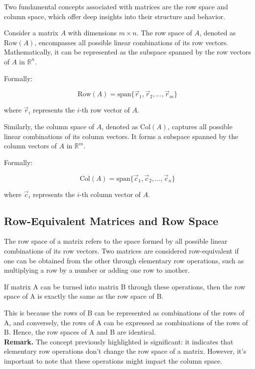Two fundamental concepts associated with matrices are the row space and column space, which offer deep insights into their structure and behavior.

Consider a matrix $A$ with dimensions $m \times n$. The row space of $A$, denoted as $\text{Row}(A)$, encompasses all possible linear combinations of its row vectors. Mathematically, it can be represented as the subspace spanned by the row vectors of $A$ in $\mathbb{R}^n$. 

Formally:

\[
\text{Row}(A) = \text{span}\{\vec{r}_1, \vec{r}_2, \ldots, \vec{r}_m\}
\]

where $\vec{r}_i$ represents the $i$-th row vector of $A$.

Similarly, the column space of $A$, denoted as $\text{Col}(A)$, captures all possible linear combinations of its column vectors. It forms a subspace spanned by the column vectors of $A$ in $\mathbb{R}^m$. 

Formally:

\[
\text{Col}(A) = \text{span}\{\vec{c}_1, \vec{c}_2, \ldots, \vec{c}_n\}
\]

where $\vec{c}_i$ represents the $i$-th column vector of $A$.

\subsection{Row-Equivalent Matrices and Row Space}

The row space of a matrix refers to the space formed by all possible linear combinations of its row vectors. Two matrices are considered row-equivalent if one can be obtained from the other through elementary row operations, such as multiplying a row by a number or adding one row to another. 

If matrix A can be turned into matrix B through these operations, then the row space of A is exactly the same as the row space of B.

This is because the rows of B can be represented as combinations of the rows of A, and conversely, the rows of A can be expressed as combinations of the rows of B. Hence, the row spaces of A and B are identical.
\\

\textbf{Remark.}
The concept previously highlighted is significant: it indicates that elementary row operations don't change the row space of a matrix. However, it's important to note that these operations might impact the column space.

